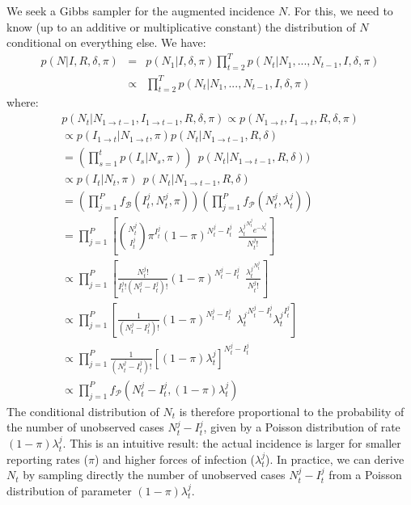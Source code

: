 \documentclass[a4paper,11pt]{article}
\begin{document}
We seek a Gibbs sampler for the augmented incidence $N$.
For this, we need to know (up to an additive or multiplicative constant) the 
distribution of $N$ conditional on everything else.
We have:
\begin{eqnarray}
 p(N|I, R, \delta, \pi) & = & p(N_1 | I, 
\delta, \pi) \prod_{t=2}^T p(N_t | N_1, ..., N_{t-1}, I, 
\delta, \pi) \\
&\propto & \prod_{t=2}^T p(N_t | N_1, ..., N_{t-1}, I, 
\delta, \pi)
\end{eqnarray}
where:
\begin{eqnarray}
p(N_t | N_{1 \rightarrow t-1}, I_{1 \rightarrow t-1}, R, \delta, \pi) 
\propto p(N_{1 \rightarrow t}, I_{1 \rightarrow t}, R, \delta, \pi) \\
\propto p( I_{1 \rightarrow t} | N_{1 \rightarrow t}, \pi) 
p(N_t | N_{1 \rightarrow t-1},  R, \delta) \\
= (\prod_{s=1}^t p(I_s| N_s, \pi)) \:\:
p(N_t | N_{1 \rightarrow t-1}, R, \delta))  \\
\propto p(I_t | N_t, \pi) \:\:
p(N_t | N_{1 \rightarrow t-1},  R, \delta)\\
= (\prod_{j=1}^P f_{\mathcal{B}}(I_t^j, N_t^j, \pi))
(\prod_{j=1}^P  f_{\mathcal{P}}(N_t^j, \lambda_t^j))\\
= \prod_{j=1}^P [ {N_t^j \choose I_t^j} \pi^{I_t^j} 
(1-\pi)^{N_t^j - I_t^j} \:\: 
\frac{{\lambda_t^j}^{N_t^j} e^{-\lambda_t^j}}{N_t^j!}]\\
\propto \prod_{j=1}^P [ \frac{N_t^j!}{I_t^j!(N_t^j-I_t^j)!} 
(1-\pi)^{N_t^j - I_t^j} \:\: 
\frac{{\lambda_t^j}^{N_t^j}}{N_t^j!}]\\
\propto \prod_{j=1}^P [ \frac{1}{(N_t^j-I_t^j)!} 
(1-\pi)^{N_t^j - I_t^j} \:\: 
{\lambda_t^j}^{N_t^j - I_t^j}{\lambda_t^j}^{I_t^j}]\\
\propto \prod_{j=1}^P \frac{1}{(N_t^j-I_t^j)!} 
[(1-\pi)\lambda_t^j]^{N_t^j - I_t^j}\\
\propto \prod_{j=1}^P f_{\mathcal{P}}(N_t^j-I_t^j , (1-\pi)\lambda_t^j)
\end{eqnarray}
The conditional distribution of $N_t$ is therefore proportional to the 
probability of the number of unobserved cases $N_t^j-I_t^j$, given by a Poisson 
distribution of rate $(1-\pi)\lambda_t^j$. This is an intuitive result: the 
actual incidence is larger for smaller reporting rates ($\pi$) and higher 
forces of infection ($\lambda_t^j$).
In practice, we can derive $N_t$ by sampling directly the number of unobserved 
cases $N_t^j-I_t^j$ from a Poisson distribution of parameter 
$(1-\pi)\lambda_t^j$.
\end{document}
